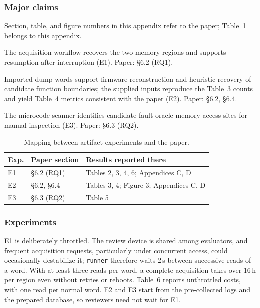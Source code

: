 \documentclass[nonacm,sigconf]{acmart}
\begin{document}
\subsubsection{Major claims}
Section, table, and figure numbers in this appendix refer to the paper;
Table~\ref{tab:ae-mapping} belongs to this appendix.
\begin{compactitem}
\item[(C1)] The acquisition workflow recovers the two memory regions
and supports resumption after interruption (E1). Paper: \S6.2 (RQ1).
\item[(C2)] Imported dump words support firmware reconstruction and
heuristic recovery of candidate function boundaries; the supplied inputs
reproduce the Table~3 counts and yield Table~4 metrics consistent with
the paper (E2). Paper: \S6.2, \S6.4.
\item[(C3)] The microcode scanner identifies candidate fault-oracle
memory-access sites for manual inspection (E3). Paper: \S6.3 (RQ2).
\end{compactitem}

\begin{table}[h]
\footnotesize
\caption{Mapping between artifact experiments and the paper.}
\label{tab:ae-mapping}
\begin{tabular}{@{}llp{4.5cm}@{}}
\toprule
Exp. & Paper section & Results reported there \\
\midrule
E1 & \S6.2 (RQ1) & Tables 2, 3, 4, 6; Appendices C, D \\
E2 & \S6.2, \S6.4 & Tables 3, 4; Figure 3; Appendices C, D \\
E3 & \S6.3 (RQ2) & Table 5 \\
\bottomrule
\end{tabular}
\end{table}

\subsubsection{Experiments}
E1 is deliberately throttled. The review device is shared among
evaluators, and frequent acquisition requests, particularly under
concurrent access, could occasionally destabilize it; \texttt{runner}
therefore waits 2\,s between successive reads of a word. With at least
three reads per word, a complete acquisition takes over 16\,h per
region even without retries or reboots. Table~6 reports unthrottled
costs, with one read per normal word. E2 and E3 start from the
pre-collected logs and the prepared database, so reviewers need not wait
for E1.
\end{document}
